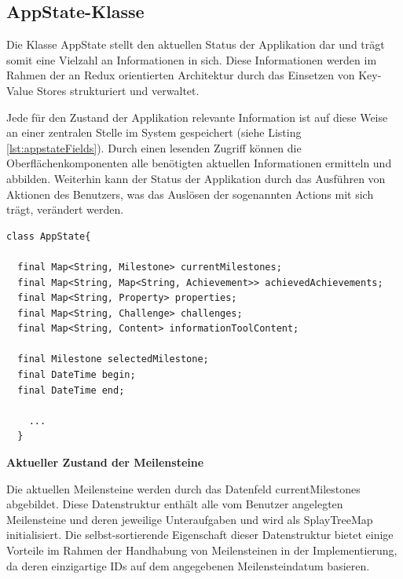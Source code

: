 \documentclass[bibliography=totoc,listof=totoc,BCOR=5mm,DIV=12,oneside]{scrbook}
\begin{document}
{\subsection{AppState-Klasse}
\par Die Klasse AppState stellt den aktuellen Status der Applikation dar und trägt somit eine Vielzahl an Informationen in sich. Diese Informationen werden im Rahmen der an Redux orientierten Architektur durch das Einsetzen von Key-Value Stores strukturiert und verwaltet. 

\par \medskip Jede für den Zustand der Applikation relevante Information ist auf diese Weise an einer zentralen Stelle im System gespeichert (siehe Listing \ref{lst:appstateFields}). Durch einen lesenden Zugriff können die Oberflächenkomponenten alle benötigten aktuellen Informationen ermitteln und abbilden. Weiterhin kann der Status der Applikation durch das Ausführen von Aktionen des Benutzers, was das Auslösen der sogenannten Actions mit sich trägt, verändert werden.
  
  \bigskip
 \begin{lstlisting}[caption={Datenfelder der AppState-Klasse},captionpos=b, label=lst:appstateFields]
class AppState{

  final Map<String, Milestone> currentMilestones;
  final Map<String, Map<String, Achievement>> achievedAchievements;
  final Map<String, Property> properties;
  final Map<String, Challenge> challenges;
  final Map<String, Content> informationToolContent; 
 
  final Milestone selectedMilestone;
  final DateTime begin;
  final DateTime end;

	...
  }
\end{lstlisting}
\bigskip



\par \bigskip \textbf{Aktueller Zustand der Meilensteine}
\par Die aktuellen Meilensteine werden durch das Datenfeld currentMilestones abgebildet. Diese Datenstruktur enthält alle vom Benutzer angelegten Meilensteine und deren jeweilige Unteraufgaben und wird als SplayTreeMap initialisiert. Die selbst-sortierende Eigenschaft dieser Datenstruktur bietet einige Vorteile im Rahmen der Handhabung von Meilensteinen in der Implementierung, da deren einzigartige IDs auf dem angegebenen Meilensteindatum basieren.

}
\end{document}
